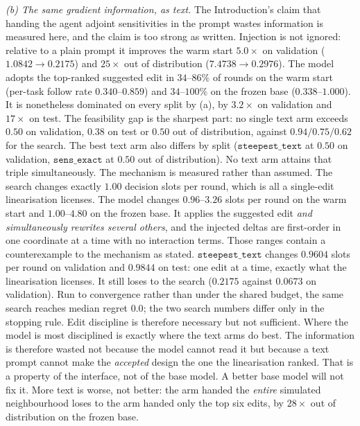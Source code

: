 \emph{(b) The same gradient information, as text.} The Introduction's claim that
handing the agent adjoint sensitivities in the prompt wastes information is measured here, and the claim is too strong as written. Injection is not ignored: relative to a plain prompt it improves the warm start
$5.0\times$ on validation ($1.0842\to0.2175$) and $25\times$ out of distribution
($7.4738\to0.2976$).  The model adopts the top-ranked suggested edit in $34$--$86\%$
of rounds on the warm start (per-task follow rate $0.340$--$0.859$) and
$34$--$100\%$ on the frozen base ($0.338$--$1.000$).  It is nonetheless dominated on every split by (a), by $3.2\times$ on validation and
$17\times$ on test.  The feasibility gap is the sharpest part: no single text arm
exceeds $0.50$ on validation, $0.38$ on test or $0.50$ out of distribution, against
$0.94/0.75/0.62$ for the search.  The best text arm also differs by split
($\texttt{steepest\_text}$ at $0.50$ on validation, $\texttt{sens\_exact}$ at $0.50$
out of distribution).  No text arm attains that triple simultaneously. The mechanism is measured rather than assumed.  The search changes exactly $1.00$
decision slots per round, which is all a single-edit linearisation licenses.  The
model changes $0.96$--$3.26$ slots per round on the warm start and $1.00$--$4.80$ on
the frozen base. It applies
the suggested edit \emph{and simultaneously rewrites several others}, and the
injected deltas are first-order in one coordinate at a time with no interaction
terms. Those ranges contain a counterexample to the mechanism as stated.
$\texttt{steepest\_text}$ changes $0.9604$ slots per round on validation and $0.9844$
on test: one edit at a time, exactly what the linearisation licenses.  It still loses
to the search ($0.2175$ against $0.0673$ on validation).  Run to convergence rather
than under the shared budget, the same search reaches median regret $0.0$; the two
search numbers differ only in the stopping rule. Edit discipline is therefore
necessary but not sufficient. Where the model is most disciplined is exactly where the text arms do best.
The information is therefore wasted not because the model cannot read it but
because a text prompt cannot make the \emph{accepted} design the one the linearisation
ranked.  That is a property of the interface, not of the base model.  A better base
model will not fix it. More text is worse, not better: the arm handed the
\emph{entire} simulated neighbourhood loses to the arm handed only the top six edits,
by $28\times$ out of distribution on the frozen base.

